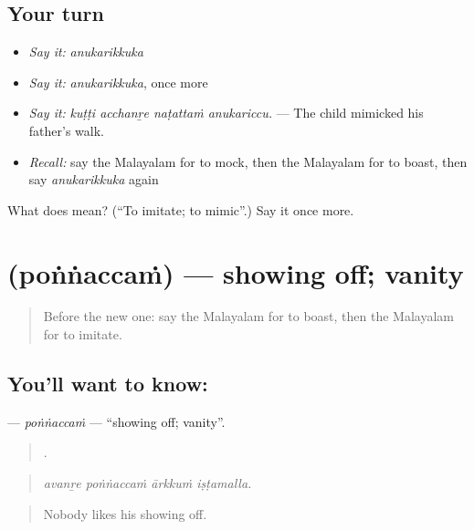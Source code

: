 \subsection*{Your turn}
\begin{itemize}
\raggedright
  \item \emph{Say it:} \emph{anukarikkuka}
  \item \emph{Say it:} \emph{anukarikkuka}, once more
  \item \emph{Say it:} \emph{kuṭṭi acchanṟe naṭattaṁ anukariccu.} — The child mimicked his father's walk.
  \item \emph{Recall:} say the Malayalam for to mock, then the Malayalam for to boast, then say \emph{anukarikkuka} again
\end{itemize}

\begin{tcolorbox}[breakable,colback=teal!4,colframe=teal!35!black,title={Before you move on}]
What does  mean? (\textquotedblleft{}To imitate; to mimic\textquotedblright{}.) Say it once more.
\end{tcolorbox}
\section[\texorpdfstring{\ml{പൊങ്ങച്ചം} (poṅṅaccaṁ)}{പൊങ്ങച്ചം (poṅṅaccaṁ)}]{ (poṅṅaccaṁ) — showing off; vanity}

\label{lesson:ML-C531-ponnaccam}



\begin{quote}
Before the new one: say the Malayalam for to boast, then the Malayalam for to imitate.
\end{quote}

\subsection*{You'll want to know: }
\textbf{} — \emph{poṅṅaccaṁ} — \textquotedblleft{}showing off; vanity\textquotedblright{}.

\begin{quote}
   .
\end{quote}

\begin{quote}
\emph{avanṟe poṅṅaccaṁ ārkkuṁ iṣṭamalla.}
\end{quote}

\begin{quote}
Nobody likes his showing off.
\end{quote}

